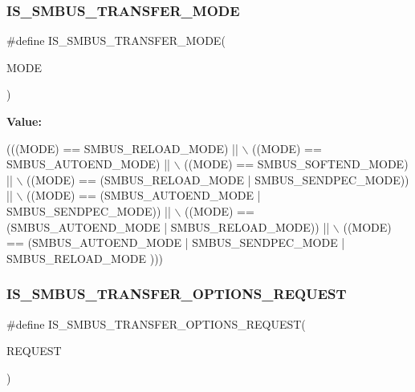 \subsubsection{\texorpdfstring{I\+S\+\_\+\+S\+M\+B\+U\+S\+\_\+\+T\+R\+A\+N\+S\+F\+E\+R\+\_\+\+M\+O\+DE}{IS\_SMBUS\_TRANSFER\_MODE}}
{\footnotesize\ttfamily \#define I\+S\+\_\+\+S\+M\+B\+U\+S\+\_\+\+T\+R\+A\+N\+S\+F\+E\+R\+\_\+\+M\+O\+DE(\begin{DoxyParamCaption}\item[{}]{M\+O\+DE }\end{DoxyParamCaption})}

{\bfseries Value\+:}
\begin{DoxyCode}
(((MODE) == SMBUS\_RELOAD\_MODE)                           || \(\backslash\)
                                                          ((MODE) == SMBUS\_AUTOEND\_MODE)                   
            || \(\backslash\)
                                                          ((MODE) == SMBUS\_SOFTEND\_MODE)                   
            || \(\backslash\)
                                                          ((MODE) == (SMBUS\_RELOAD\_MODE | 
      SMBUS\_SENDPEC\_MODE))   || \(\backslash\)
                                                          ((MODE) == (SMBUS\_AUTOEND\_MODE | 
      SMBUS\_SENDPEC\_MODE))  || \(\backslash\)
                                                          ((MODE) == (SMBUS\_AUTOEND\_MODE | 
      SMBUS\_RELOAD\_MODE))   || \(\backslash\)
                                                          ((MODE) == (SMBUS\_AUTOEND\_MODE | 
      SMBUS\_SENDPEC\_MODE | SMBUS\_RELOAD\_MODE )))
\end{DoxyCode}
\mbox{\label{group___s_m_b_u_s___private___macro_gabb6675e795c2cfefae3145eb55d02b19}} 
\subsubsection{\texorpdfstring{I\+S\+\_\+\+S\+M\+B\+U\+S\+\_\+\+T\+R\+A\+N\+S\+F\+E\+R\+\_\+\+O\+P\+T\+I\+O\+N\+S\+\_\+\+R\+E\+Q\+U\+E\+ST}{IS\_SMBUS\_TRANSFER\_OPTIONS\_REQUEST}}
{\footnotesize\ttfamily \#define I\+S\+\_\+\+S\+M\+B\+U\+S\+\_\+\+T\+R\+A\+N\+S\+F\+E\+R\+\_\+\+O\+P\+T\+I\+O\+N\+S\+\_\+\+R\+E\+Q\+U\+E\+ST(\begin{DoxyParamCaption}\item[{}]{R\+E\+Q\+U\+E\+ST }\end{DoxyParamCaption})}

